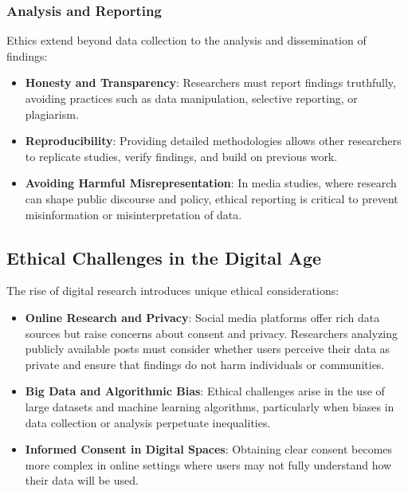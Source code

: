\documentclass[
]{book}
\providecommand{\tightlist}{%
  \setlength{\itemsep}{0pt}\setlength{\parskip}{0pt}}
\begin{document}
\subsubsection*{Analysis and Reporting}\label{analysis-and-reporting}

Ethics extend beyond data collection to the analysis and dissemination of findings:

\begin{itemize}
\tightlist
\item
  \textbf{Honesty and Transparency}: Researchers must report findings truthfully, avoiding practices such as data manipulation, selective reporting, or plagiarism.
\item
  \textbf{Reproducibility}: Providing detailed methodologies allows other researchers to replicate studies, verify findings, and build on previous work.
\item
  \textbf{Avoiding Harmful Misrepresentation}: In media studies, where research can shape public discourse and policy, ethical reporting is critical to prevent misinformation or misinterpretation of data.
\end{itemize}

\subsection*{Ethical Challenges in the Digital Age}\label{ethical-challenges-in-the-digital-age}

The rise of digital research introduces unique ethical considerations:

\begin{itemize}
\tightlist
\item
  \textbf{Online Research and Privacy}: Social media platforms offer rich data sources but raise concerns about consent and privacy. Researchers analyzing publicly available posts must consider whether users perceive their data as private and ensure that findings do not harm individuals or communities.
\item
  \textbf{Big Data and Algorithmic Bias}: Ethical challenges arise in the use of large datasets and machine learning algorithms, particularly when biases in data collection or analysis perpetuate inequalities.
\item
  \textbf{Informed Consent in Digital Spaces}: Obtaining clear consent becomes more complex in online settings where users may not fully understand how their data will be used.
\end{itemize}
\end{document}
